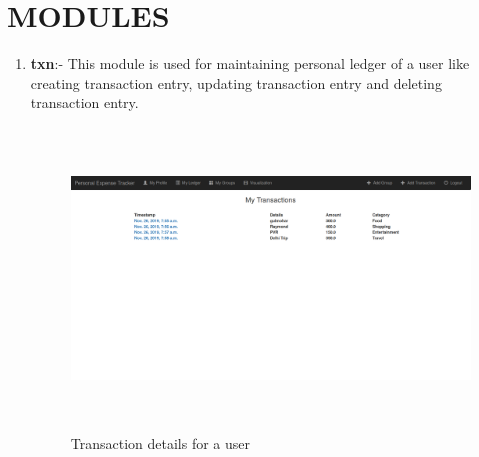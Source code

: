 \documentclass[12pt]{article}
\begin{document}
\section{MODULES}
\begin{enumerate}
    \item \textbf{txn}:- This module is used for maintaining personal ledger of a user like creating transaction entry, updating transaction entry and deleting transaction entry.
        \begin{figure}[!ht]
            \centering
            \includegraphics[height=8cm]{ledger.png}
            \caption{Transaction details for a user}
            \label{fig:my_label}
        \end{figure}


\end{enumerate}
\end{document}
